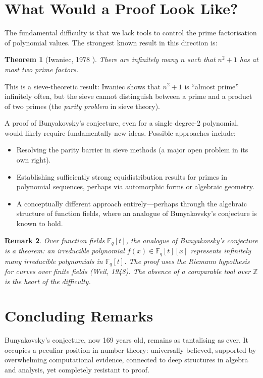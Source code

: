 \documentclass[11pt,a4paper]{article}
\newtheorem{theorem}{Theorem}
\newtheorem{remark}[theorem]{Remark}
\newcommand{\Z}{\mathbb{Z}}
\newcommand{\F}{\mathbb{F}}
\begin{document}
\section{What Would a Proof Look Like?}

The fundamental difficulty is that we lack tools to control the prime factorisation of polynomial values. The strongest known result in this direction is:

\begin{theorem}[Iwaniec, 1978 \cite{iwaniec1978}]
There are infinitely many $n$ such that $n^2 + 1$ has at most two prime factors.
\end{theorem}

This is a sieve-theoretic result: Iwaniec shows that $n^2 + 1$ is ``almost prime'' infinitely often, but the sieve cannot distinguish between a prime and a product of two primes (the \emph{parity problem} in sieve theory).

A proof of Bunyakovsky's conjecture, even for a single degree-2 polynomial, would likely require fundamentally new ideas. Possible approaches include:
\begin{itemize}
    \item Resolving the parity barrier in sieve methods (a major open problem in its own right).
    \item Establishing sufficiently strong equidistribution results for primes in polynomial sequences, perhaps via automorphic forms or algebraic geometry.
    \item A conceptually different approach entirely---perhaps through the algebraic structure of function fields, where an analogue of Bunyakovsky's conjecture is known to hold.
\end{itemize}

\begin{remark}
Over function fields $\F_q[t]$, the analogue of Bunyakovsky's conjecture is a theorem: an irreducible polynomial $f(x) \in \F_q[t][x]$ represents infinitely many irreducible polynomials in $\F_q[t]$. The proof uses the Riemann hypothesis for curves over finite fields (Weil, 1948). The absence of a comparable tool over $\Z$ is the heart of the difficulty.
\end{remark}

\section{Concluding Remarks}

Bunyakovsky's conjecture, now 169 years old, remains as tantalising as ever. It occupies a peculiar position in number theory: universally believed, supported by overwhelming computational evidence, connected to deep structures in algebra and analysis, yet completely resistant to proof.
\end{document}
